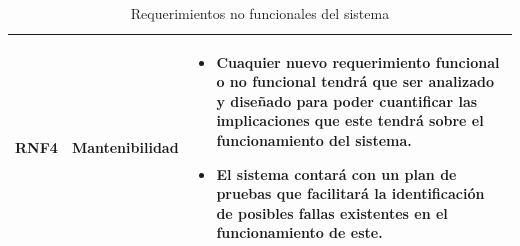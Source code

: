 \begin{table}[htb]
\begin{tabular}{| p{1.5cm} |  p{3cm} | p{11cm}|}
\\ \hline 
RNF4 & Mantenibilidad & \begin{itemize}
   \item Cuaquier nuevo requerimiento funcional o no funcional tendrá que ser analizado y diseñado para poder cuantificar las implicaciones que este tendrá sobre el funcionamiento del sistema. 
   \item El sistema contará con un plan de pruebas que facilitará la identificación de posibles fallas existentes en el funcionamiento de este. 
 \end{itemize}
\\ \hline
\end{tabular}
\caption{Requerimientos no funcionales del sistema}
\label{Servidor de Llaves }
\end{table}



